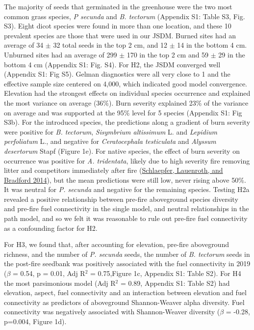 \documentclass[
  12pt,
]{article}
\begin{document}
The majority of seeds that germinated in the greenhouse were the two
most common grass species, \emph{P secunda} and \emph{B. tectorum}
(Appendix S1: Table S3, Fig. S3). Eight dicot species were found in more
than one location, and these 10 prevalent species are those that were
used in our JSDM. Burned sites had an average of 34 \(\pm\) 32 total
seeds in the top 2 cm, and 12 \(\pm\) 14 in the bottom 4 cm. Unburned
sites had an average of 299 \(\pm\) 170 in the top 2 cm and 59 \(\pm\)
29 in the bottom 4 cm (Appendix S1: Fig. S4). For H2, the JSDM converged
well (Appendix S1: Fig S5). Gelman diagnostics were all very close to 1
and the effective sample size centered on 4,000, which indicated good
model convergence. Elevation had the strongest effects on individual
species occurrence and explained the most variance on average (36\%).
Burn severity explained 23\% of the variance on average and was
supported at the 95\% level for 5 species (Appendix S1: Fig S3b). For
the introduced species, the predictions along a gradient of burn
severity were positive for \emph{B. tectorum}, \emph{Sisymbrium
altissimum} L. and \emph{Lepidium perfoliatum} L., and negative for
\emph{Ceratocephala testiculata} and \emph{Alyssum desertorum} Stapf
(Figure 1e). For native species, the effect of burn severity on
occurrence was positive for \emph{A. tridentata}, likely due to high
severity fire removing litter and competitors immediately after fire
(\protect\hyperlink{ref-Schlaepfer2014}{Schlaepfer, Lauenroth, and
Bradford 2014}), but the mean predictions were still low, never rising
above 50\%. It was neutral for \emph{P. secunda} and negative for the
remaining species. Testing H2a revealed a positive relationship between
pre-fire aboveground species diversity and pre-fire fuel connectivity in
the single model, and neutral relationships in the path model, and so we
felt it was reasonable to rule out pre-fire fuel connectivity as a
confounding factor for H2.

For H3, we found that, after accounting for elevation, pre-fire
aboveground richness, and the number of \emph{P. secunda} seeds, the
number of \emph{B. tectorum} seeds in the post-fire seedbank was
positively associated with the fuel connectivity in 2019 (\(\beta\) =
0.54, p = 0.01, Adj R\(^2\) = 0.75,Figure 1c, Appendix S1: Table S2).
For H4 the most parsimonious model (Adj R\(^2\) = 0.89, Appendix S1:
Table S2) had elevation, aspect, fuel connectivity and an interaction
between elevation and fuel connectivity as predictors of aboveground
Shannon-Weaver alpha diversity. Fuel connectivity was negatively
associated with Shannon-Weaver diversity (\(\beta\) = -0.28, p=0.004,
Figure 1d).
\end{document}
